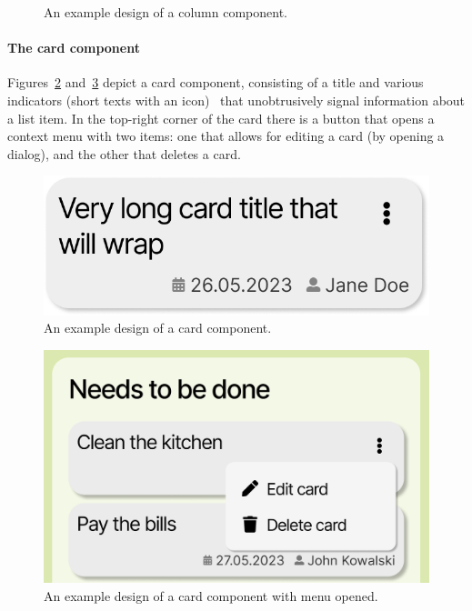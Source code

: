 \begin{figure}
    \caption{An example design of a column component.}
    \label{fig:3-4-column-component}
\end{figure}


\paragraph{The card component}
Figures~\ref{fig:3-4-card-component} and~\ref{fig:3-4-card-component-with-menu} depict a card component, consisting of a title and various indicators (short texts with an icon) \textendash\ that unobtrusively signal information about a list item.
In the top-right corner of the card there is a button that opens a context menu with two items: one that allows for editing a card (by opening a dialog), and the other that deletes a card.

\begin{figure}
    \centering
    \includegraphics[width=\textwidth]{./3-research-methodology/card-component}
    \caption{An example design of a card component.}
    \label{fig:3-4-card-component}
\end{figure}

\begin{figure}
    \centering
    \includegraphics[width=\textwidth]{./3-research-methodology/card-component-with-menu}
    \caption{An example design of a card component with menu opened.}
    \label{fig:3-4-card-component-with-menu}
\end{figure}

